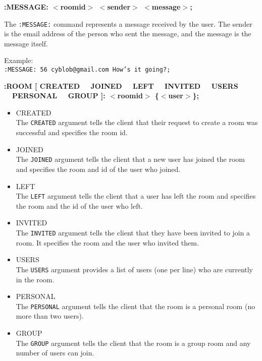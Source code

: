 {\bf :MESSAGE: $<$roomid$>$ $<$sender$>$ $<$message$>$;}

The \texttt{:MESSAGE:} command represents a message received by the user. The sender is the email address of the person who sent the message, and the message is the message itself.

Example: \\
\texttt{:MESSAGE: 56 cyblob@gmail.com How's it going?;}

{\bf :ROOM [ CREATED \ \vline \ JOINED \ \vline \ LEFT \ \vline \ INVITED \ \vline \ USERS \ \vline \ PERSONAL \ \vline \ GROUP ]: $<$roomid$>$ \{$<$user$>$\};}

\begin{itemize}

\item{CREATED \\
The \texttt{CREATED} argument tells the client that their request to create a room was successful and specifies the room id.}

\item{JOINED \\
The \texttt{JOINED} argument tells the client that a new user has joined the room and specifies the room and id of the user who joined.}

\item{LEFT \\
The \texttt{LEFT} argument tells the client that a user has left the room and specifies the room and the id of the user who left.}

\item{INVITED \\
The \texttt{INVITED} argument tells the client that they have been invited to join a room. It specifies the room and the user who invited them.}

\item{USERS \\
The \texttt{USERS} argument provides a list of users (one per line) who are currently in the room.}

\item{PERSONAL \\
The \texttt{PERSONAL} argument tells the client that the room is a personal room (no more than two users).}

\item{GROUP \\
The \texttt{GROUP} argument tells the client that the room is a group room and any number of users can join.}
	
\end{itemize}

